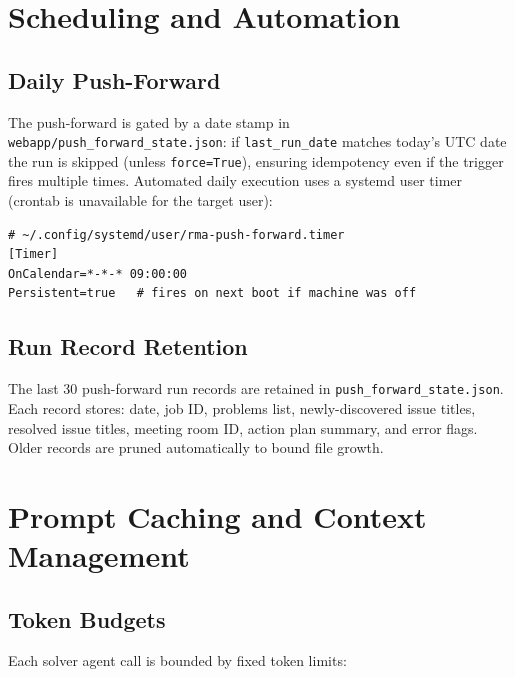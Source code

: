 \documentclass[11pt]{article}
\begin{document}
\section{Scheduling and Automation}

\subsection{Daily Push-Forward}

The push-forward is gated by a date stamp in
\texttt{webapp/push\_forward\_state.json}: if \texttt{last\_run\_date}
matches today's UTC date the run is skipped (unless \texttt{force=True}),
ensuring idempotency even if the trigger fires multiple times.
Automated daily execution uses a systemd user timer
(crontab is unavailable for the target user):

\begin{lstlisting}[caption={Systemd timer unit for daily 09:00 push-forward.}]
# ~/.config/systemd/user/rma-push-forward.timer
[Timer]
OnCalendar=*-*-* 09:00:00
Persistent=true   # fires on next boot if machine was off
\end{lstlisting}

\subsection{Run Record Retention}

The last 30 push-forward run records are retained in
\texttt{push\_forward\_state.json}.
Each record stores: date, job ID, problems list, newly-discovered issue titles,
resolved issue titles, meeting room ID, action plan summary, and error flags.
Older records are pruned automatically to bound file growth.


\section{Prompt Caching and Context Management}
\label{app:cache}

\subsection{Token Budgets}

Each solver agent call is bounded by fixed token limits:
\end{document}
